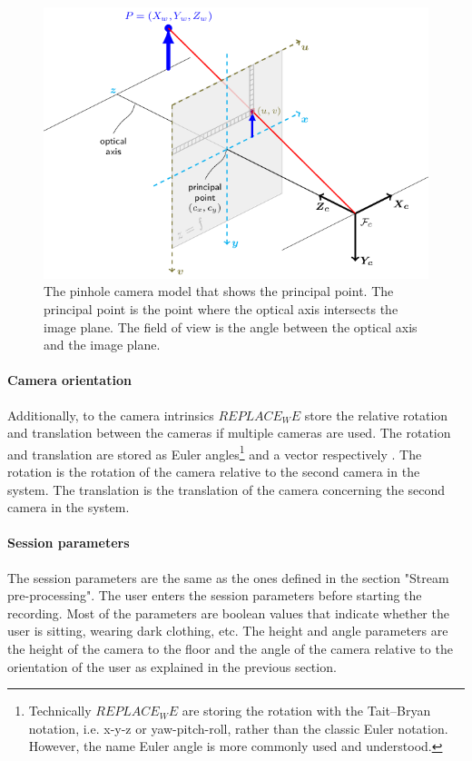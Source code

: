 \begin{figure}[ht]
  \centering
  \includegraphics[width=.9\textwidth]{figures/CameraCalibration/pinhole_camera_model.png}
  \caption[Pinhole camera model]{The pinhole camera model that shows the principal point. The principal point is the point where the optical axis intersects the image plane. The field of view is the angle between the optical axis and the image plane.}
  \label{fig:pinhole_camera_model}
\end{figure}

\paragraph{Camera orientation}

Additionally, to the camera intrinsics $REPLACE_WE$ store the relative rotation and translation between the cameras if multiple cameras are used. The rotation and translation are stored as Euler angles\footnote{Technically $REPLACE_WE$ are storing the rotation with the Tait–Bryan notation, i.e. x-y-z or yaw-pitch-roll, rather than the classic Euler notation. However, the name Euler angle is more commonly used and understood.} and a vector respectively \cite{euler1776formulae}. The rotation is the rotation of the camera relative to the second camera in the system. The translation is the translation of the camera concerning the second camera in the system.

\paragraph{Session parameters}

The session parameters are the same as the ones defined in the section "Stream pre-processing". The user enters the session parameters before starting the recording. Most of the parameters are boolean values that indicate whether the user is sitting, wearing dark clothing, etc. The height and angle parameters are the height of the camera to the floor and the angle of the camera relative to the orientation of the user as explained in the previous section.

